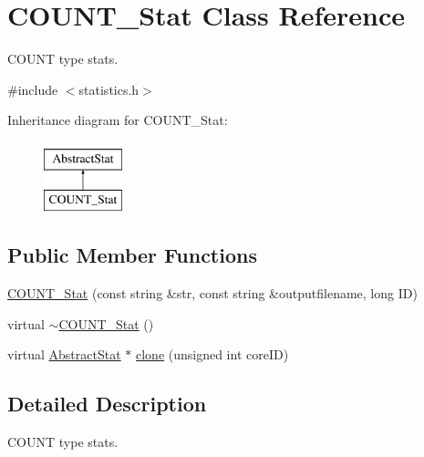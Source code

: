 \hypertarget{classCOUNT__Stat}{
\section{COUNT\_\-Stat Class Reference}
\label{classCOUNT__Stat}
}


COUNT type stats.  




{\ttfamily \#include $<$statistics.h$>$}

Inheritance diagram for COUNT\_\-Stat:\begin{figure}[H]
\begin{center}
\leavevmode
\includegraphics[height=2.000000cm]{classCOUNT__Stat}
\end{center}
\end{figure}
\subsection*{Public Member Functions}
\begin{DoxyCompactItemize}
\item 
\hyperlink{classCOUNT__Stat_ab306d33117de1ab68ce7307c937f1f29}{COUNT\_\-Stat} (const string \&str, const string \&outputfilename, long ID)
\item 
virtual \hyperlink{classCOUNT__Stat_a080c807a9cf2da4fc1fd7c5ffb233528}{$\sim$COUNT\_\-Stat} ()
\item 
virtual \hyperlink{classAbstractStat}{AbstractStat} $\ast$ \hyperlink{classCOUNT__Stat_ad985ac068e44a565f76f1615b2677022}{clone} (unsigned int coreID)
\end{DoxyCompactItemize}


\subsection{Detailed Description}
COUNT type stats. 

